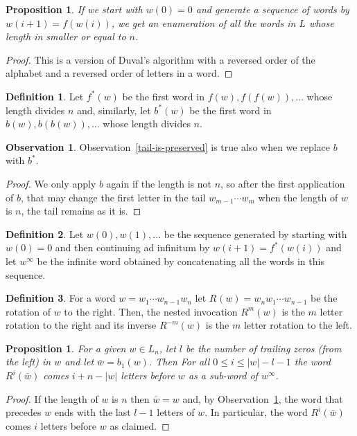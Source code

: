 \documentclass{article}
\newtheorem{proposition}[theorem]{Proposition}
\theoremstyle{definition}
\newtheorem{definition}{Definition}
\newtheorem{observation}[theorem]{Observation}
\newcommand{\rr}[2]{R^{#2}({#1})}
\newcommand{\rl}[2]{R^{-{#2}}({#1})}
\begin{document}
\begin{proposition}
	If we start with $w(0)=0$ and generate a sequence of words by $w({i+1})=f(w(i))$, we get an enumeration of all the words in $L$ whose length in smaller or equal to $n$.
\end{proposition}
\begin{proof}
	This is a version of Duval's algorithm with a reversed order of the alphabet and a reversed order of letters in a word.
\end{proof}

\begin{definition}
	Let $f^*(w)$ be the first word in ${f(w),f(f(w)),\dots}$ whose length divides $n$ and, similarly, let $b^*(w)$ be the first word in ${b(w),b(b(w)),\dots}$ whose length divides $n$. 
\end{definition}

\begin{observation} \label{tail-is-preserved-by-bstart}
	Observation~\ref{tail-is-preserved} is true also when we replace $b$ with $b^*$. 
\end{observation}
\begin{proof}
We only apply $b$ again if the length is not $n$, so after the first application of $b$, that may change the first letter in the tail $w_{m-1}\cdots w_m$ when the length of $w$ is $n$, the tail remains as it is.
\end{proof}


\begin{definition}
	Let $w(0),w(1),...$ be the sequence generated by starting with $w(0)=0$ and then continuing ad infinitum by $w{(i+1)}=f^*(w(i))$ and let $w^\infty$ be the infinite word obtained by concatenating all the words in this sequence.
\end{definition}


\begin{definition}
	For a word $w=w_1\cdots w_{n-1}w_n$ let  $\rr{w}{}= w_{n}w_1\cdots w_{n-1}$ be the rotation of $w$ to the right. Then, the nested invocation $\rr{w}{m}$ is the $m$ letter rotation to the right and its inverse $\rl{w}{m}$ is the $m$ letter rotation to the left.
\end{definition}

\begin{proposition}\label{simple-pos}
	For a given $w \in L_n$, let $l$ be the number of trailing zeros (from the left) in $w$ and let $\bar{w}=b_1(w)$. Then For all $0 \leq i \leq |w|-l-1$ the word $\rr{\bar{w}}{i}$ comes $i+n-|w|$ letters before $w$ as a sub-word of $w^\infty$.
\end{proposition}
\begin{proof}
	If the length of $w$ is $n$ then $\bar{w}=w$ and, by Observation~\ref{tail-is-preserved-by-bstart}, the word that precedes $w$ ends with the last $l-1$ letters of $w$. In particular, the word $\rr{\bar{w}}{i}$ comes $i$ letters before $w$ as claimed.
	
	
\end{proof}
\end{document}
